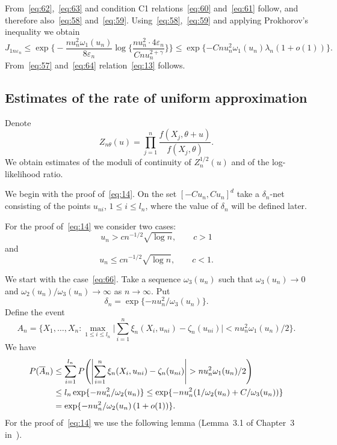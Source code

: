\documentclass[11pt,a4paper]{article}
\begin{document}
From~\eqref{eq:62},~\eqref{eq:63} and condition C1 relations~\eqref{eq:60} and~\eqref{eq:61} follow, and therefore also~\eqref{eq:58} and~\eqref{eq:59}. Using~\eqref{eq:58},~\eqref{eq:59} and applying Prokhorov's inequality we obtain
\begin{equation}
J_{1n\varepsilon_n}\le\exp\Biggl\{-\frac{nu_n^2\omega_1(u_n)}{8\varepsilon_n}\log\Biggl\{\frac{nu_n^2\cdot4\varepsilon_n}{Cnu_n^{2+\gamma}}\Biggr\}\Biggr\}
\le\exp\{-Cnu_n^2\omega_1(u_n)\lambda_n(1+o(1))\}.
\label{eq:64}
\end{equation}
From~\eqref{eq:57} and~\eqref{eq:64} relation~\eqref{eq:13} follows.

\subsection{Estimates of the rate of uniform approximation}
\label{sub:uniform}

Denote
\begin{equation}
Z_{n\theta}(u)=\prod_{j=1}^n\frac{f(X_j,\theta+u)}{f(X_j,\theta)}.
\label{eq:65}
\end{equation}
We obtain estimates of the moduli of continuity of $Z_n^{1/2}(u)$ and of the log-likelihood ratio.

We begin with the proof of~\eqref{eq:14}. On the set $[-Cu_n,Cu_n]^d$ take a $\delta_n$-net consisting of the points $u_{ni}$, $1\le i\le l_n$, where the value of $\delta_n$ will be defined later.

For the proof of~\eqref{eq:14} we consider two cases:
\begin{equation}
u_n>cn^{-1/2}\sqrt{\log n},\qquad c>1
\label{eq:66}
\end{equation}
and
\begin{equation}
u_n\le cn^{-1/2}\sqrt{\log n},\qquad c<1.
\label{eq:67}
\end{equation}

We start with the case~\eqref{eq:66}. Take a sequence $\omega_3(u_n)$ such that $\omega_3(u_n)\to0$ and $\omega_2(u_n)/\omega_3(u_n)\to\infty$ as $n\to\infty$. Put
\[
\delta_n=\exp\{-nu_n^2/\omega_3(u_n)\}.
\]
Define the event
\begin{equation}
A_n=\Biggl\{X_1,\dots,X_n:\max_{1\le i\le l_n}\Biggl|\sum_{i=1}^n\xi_n(X_i,u_{ni})-\zeta_n(u_{ni})\Biggr|<nu_n^2\omega_1(u_n)/2\Biggr\}.
\label{eq:68}
\end{equation}
We have
\begin{align}
P(\overline{A}_n)
&\le\sum_{i=1}^{l_n}P\Biggl(\Biggl|\sum_{i=1}^n\xi_n(X_i,u_{ni})-\zeta_n(u_{ni})\Biggr|>nu_n^2\omega_1(u_n)/2\Biggr)\notag\\
&\le l_n\exp\{-nu_n^2/\omega_2(u_n)\}\le\exp\{-nu_n^2(1/\omega_2(u_n)+C/\omega_3(u_n))\}\notag\\
&=\exp\{-nu_n^2/\omega_2(u_n)\,(1+o(1))\}.
\label{eq:69}
\end{align}
For the proof of~\eqref{eq:14} we use the following lemma (Lemma~3.1 of Chapter~3 in~\cite{10}).
\end{document}

